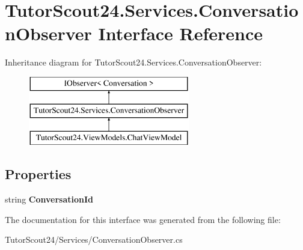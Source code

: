 \hypertarget{interface_tutor_scout24_1_1_services_1_1_conversation_observer}{}\section{Tutor\+Scout24.\+Services.\+Conversation\+Observer Interface Reference}
\label{interface_tutor_scout24_1_1_services_1_1_conversation_observer}
Inheritance diagram for Tutor\+Scout24.\+Services.\+Conversation\+Observer\+:\begin{figure}[H]
\begin{center}
\leavevmode
\includegraphics[height=3.000000cm]{interface_tutor_scout24_1_1_services_1_1_conversation_observer}
\end{center}
\end{figure}
\subsection*{Properties}
\begin{DoxyCompactItemize}
\item 
\mbox{\label{interface_tutor_scout24_1_1_services_1_1_conversation_observer_a0dce094ac41f973ab6640c36ca71e91b}} 
string {\bfseries Conversation\+Id}
\end{DoxyCompactItemize}


The documentation for this interface was generated from the following file\+:\begin{DoxyCompactItemize}
\item 
Tutor\+Scout24/\+Services/Conversation\+Observer.\+cs\end{DoxyCompactItemize}
